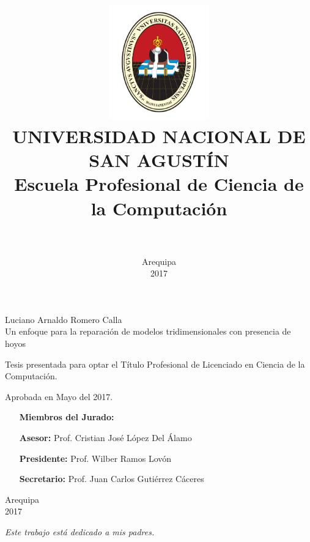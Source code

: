 \documentclass[11pt,a4paper]{report}
\title
{
	\includegraphics[width=0.32\textwidth]{figures/unsa}\\\vspace{1cm}
	\large UNIVERSIDAD NACIONAL DE SAN AGUSTÍN\\ 
	Escuela Profesional de Ciencia de la Computación\\\vspace{3cm}
	\Large\bf\mytitle\\\vspace{2cm}
}
\author{\Large\sc\myauthor}
\date{\vspace{3cm}\sc Arequipa\\2017}
\theoremstyle{custom}
\numberwithin{mydef}{chapter}
\def\myauthor{Luciano Arnaldo Romero Calla}
\def\mytitle{Un enfoque para la reparación de modelos tridimensionales con presencia de hoyos}
\begin{document}
\maketitle

\begin{titlepage}
\begin{center}
{\Large\sc\myauthor}\\\vspace{2cm}
{\Large\mytitle}\\\vspace{3cm}
\end{center}
\null\hfill
\begin{minipage}{0.48\textwidth}
\large
Tesis presentada para optar el Título Profesional de
Licenciado en Ciencia de la Computación.
\end{minipage}

\bigskip\vspace{2cm}
\large Aprobada en Mayo del 2017.\\\vspace{2cm}

\null\hfill
\begin{minipage}{0.52\textwidth}
\large
\begin{itemize}
\item[] \textbf{Miembros del Jurado:}
\item[\bf Asesor:] Prof. Cristian José López Del Álamo
\item[\bf Presidente:] Prof. Wilber Ramos Lovón
\item[\bf Secretario:] Prof. Juan Carlos Gutiérrez Cáceres
\end{itemize}
\end{minipage}

\bigskip\vspace{4cm}
\begin{center}
\large\sc Arequipa\\2017
\end{center}
\end{titlepage}

\begin{titlepage}
\null\vfill\null\hfill\em Este trabajo está dedicado a mis padres.
\end{titlepage}

\setlength{\parskip}{1em}

%

\setlength{\parskip}{0em}
\tableofcontents
\listoffigures
\listoftables

\setlength{\parskip}{1em}

\end{document}
